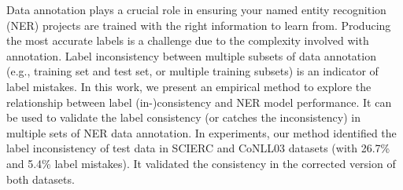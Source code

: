 Data annotation plays a crucial role in ensuring your named entity recognition (NER) projects are trained with the right information to learn from. Producing the most accurate labels is a challenge due to the complexity involved with annotation. Label inconsistency between multiple subsets of data annotation (e.g., training set and test set, or multiple training subsets) is an indicator of label mistakes. In this work, we present an empirical method to explore the relationship between label (in-)consistency and NER model performance. It can be used to validate the label consistency (or catches the inconsistency) in multiple sets of NER data annotation. In experiments, our method identified the label inconsistency of test data in SCIERC and CoNLL03 datasets (with 26.7\% and 5.4\% label mistakes). It validated the consistency in the corrected version of both datasets.
